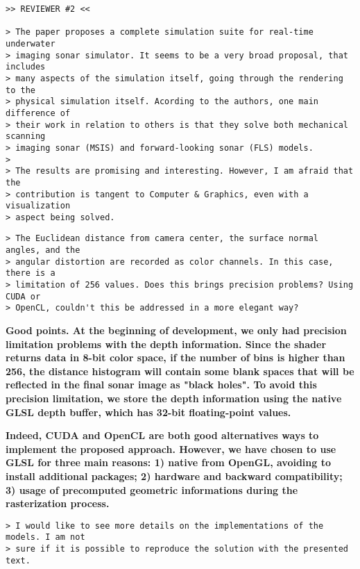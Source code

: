 \documentclass{article}
\begin{document}

\begin{verbatim}
>> REVIEWER #2 <<

> The paper proposes a complete simulation suite for real-time underwater
> imaging sonar simulator. It seems to be a very broad proposal, that includes
> many aspects of the simulation itself, going through the rendering to the
> physical simulation itself. Acording to the authors, one main difference of
> their work in relation to others is that they solve both mechanical scanning
> imaging sonar (MSIS) and forward-looking sonar (FLS) models.
>
> The results are promising and interesting. However, I am afraid that the
> contribution is tangent to Computer & Graphics, even with a visualization
> aspect being solved.
\end{verbatim}


\begin{verbatim}
> The Euclidean distance from camera center, the surface normal angles, and the
> angular distortion are recorded as color channels. In this case, there is a
> limitation of 256 values. Does this brings precision problems? Using CUDA or
> OpenCL, couldn't this be addressed in a more elegant way?
\end{verbatim}

\textbf{Good points. At the beginning of development, we only had precision
limitation problems with the depth information. Since the shader returns data
in 8-bit color space, if the number of bins is higher than 256, the distance
histogram will contain some blank spaces that will be reflected in the final
sonar image as "black holes". To avoid this precision limitation, we store the
depth information using the native GLSL depth buffer, which has 32-bit
floating-point values.}

\textbf{Indeed, CUDA and OpenCL are both good alternatives ways to implement
the proposed approach. However, we have chosen to use GLSL for three main reasons:
1) native from OpenGL, avoiding to install additional packages;
2) hardware and backward compatibility;
3) usage of precomputed geometric informations during the rasterization process.}

\begin{verbatim}
> I would like to see more details on the implementations of the models. I am not
> sure if it is possible to reproduce the solution with the presented text.
\end{verbatim}
\end{document}
